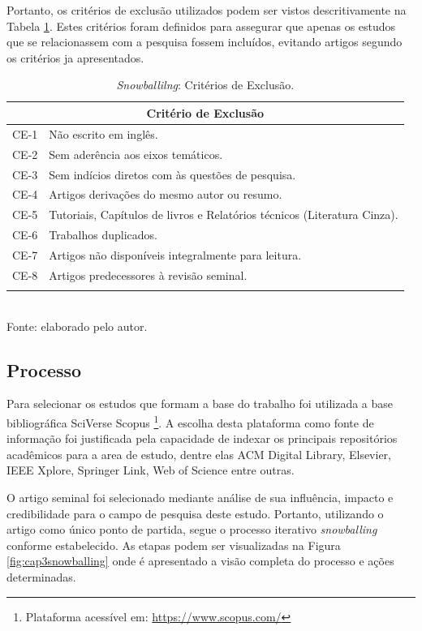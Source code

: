 Portanto, os critérios de exclusão utilizados podem ser vistos descritivamente na Tabela \ref{table:cap3:criterios}. Estes critérios foram definidos para assegurar que apenas os estudos que se relacionassem com a pesquisa fossem incluídos, evitando artigos segundo os critérios ja apresentados.


\begingroup
\begin{table}[htbp]
	
	\centering
	\caption{\textit{Snowballilng}: Critérios de Exclusão.}
	\begin{tabular}{ l | l  }
		\hline
		 \multicolumn{2}{c}{Critério de Exclusão}  \\
		\hline\addlinespace[1pt]
		CE-1	& Não escrito em inglês. \\
      	CE-2	& Sem aderência aos eixos temáticos. \\
		CE-3	& Sem indícios diretos com às questões de pesquisa.\\
		CE-4	& Artigos derivações do mesmo autor  ou resumo.\\
		CE-5	& Tutoriais, Capítulos de livros e Relatórios técnicos (Literatura Cinza).\\
		CE-6	& Trabalhos duplicados.\\
		CE-7	& Artigos não disponíveis integralmente para leitura.\\
		CE-8	&  Artigos predecessores à revisão seminal.\\
		\hline\addlinespace[2pt]
	\end{tabular}
	\label{table:cap3:criterios}
	\\
	\footnotesize Fonte: elaborado pelo autor.
	
\end{table}
\endgroup

\subsection{Processo}

Para selecionar os estudos que formam a base do trabalho foi utilizada a base bibliográfica SciVerse Scopus
\footnote{Plataforma acessível em: \url{https://www.scopus.com/}}. A escolha desta plataforma como fonte de informação foi justificada pela capacidade de indexar os principais repositórios acadêmicos para a area de estudo, dentre elas ACM Digital Library, Elsevier, IEEE Xplore, Springer Link, Web of Science entre outras.

O artigo seminal foi selecionado mediante análise de sua influência, impacto e credibilidade para o campo de pesquisa deste estudo. Portanto, utilizando o artigo como único ponto de partida, segue o processo iterativo \textit{snowballing} conforme estabelecido. As etapas podem ser visualizadas na Figura \ref{fig:cap3snowballing} onde é apresentado a visão completa do processo e ações determinadas.


